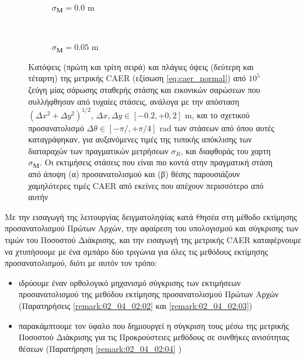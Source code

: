 \begin{figure}[!h]
  \begin{subfigure}{\linewidth}\hspace{1cm}
    
    \vspace{0.25cm}
    \caption{\small $\sigma_{\bm{M}} = 0.0$ m}
    \vspace{0.5cm}
  \end{subfigure}\\%
  \begin{subfigure}{\linewidth}\hspace{1cm}
    
    \vspace{0.25cm}
    \caption{\small $\sigma_{\bm{M}} = 0.05$ m}
    \vspace{0.5cm}
  \end{subfigure}%
  \vspace{-0.25cm}
  \caption{\small Κατόψεις (πρώτη και τρίτη σειρά) και πλάγιες όψεις
           (δεύτερη και τέταρτη) της μετρικής CAER (εξίσωση
           \ref{eq:caer_normal}) από $10^5$ ζεύγη μίας σάρωσης σταθερής στάσης
           και εικονικών σαρώσεων που συλλήφθησαν από τυχαίες στάσεις, ανάλογα
           με την απόσταση $(\Delta x^2 + \Delta y^2)^{1/2}$, $\Delta x, \Delta
           y \in [-0.2, +0,2]$ m, και το σχετικού προσανατολισμό $\Delta \theta
           \in [-\pi/, +\pi/4]$ rad των στάσεων από όπου αυτές καταγράφηκαν,
           για αυξανόμενες τιμές της τυπικής απόκλισης των διαταραχών των
           πραγματικών μετρήσεων $\sigma_R$, και διαφθοράς του χαρτη
           $\sigma_{\bm{M}}$. Οι εκτιμήσεις στάσεις που είναι πιο κοντά στην
           πραγματική στάση από άποψη (α) προσανατολισμού και (β) θέσης
           παρουσιάζουν χαμηλότερες τιμές CAER από εκείνες που απέχουν
           περισσότερο από αυτήν}
  \label{fig:02_04_04:caer}
\end{figure}

Με την εισαγωγή της λειτουργίας δειγματοληψίας κατά Θησέα στη μέθοδο εκτίμησης
προσανατολισμού Πρώτων Αρχών, την αφαίρεση του υπολογισμού και σύγκρισης των
τιμών του Ποσοστού Διάκρισης, και την εισαγωγή της μετρικής CAER καταφέρνουμε
να χτυπήσουμε με ένα σμπάρο δύο τριγώνια για όλες τις μεθόδους εκτίμησης
προσανατολισμού, διότι με αυτόν τον τρόπο:

\begin{itemize}
  \item ιδρύουμε έναν ορθολογικό μηχανισμό σύγκρισης των
        εκτιμήσεων προσανατολισμού της μεθόδου εκτίμησης προσανατολισμού Πρώτων
        Αρχών (Παρατηρήσεις \ref{remark:02_04_02:02} και
        \ref{remark:02_04_02:03})
  \item παρακάμπτουμε τον ύφαλο που δημιουργεί η σύγκριση τους μέσω της μετρικής
        Ποσοστού Διάκρισης για τις Προκρούστειες μεθόδους σε συνθήκες ανισότητας
        θέσεων (Παρατήρηση \ref{remark:02_04_02:04} )
\end{itemize}

